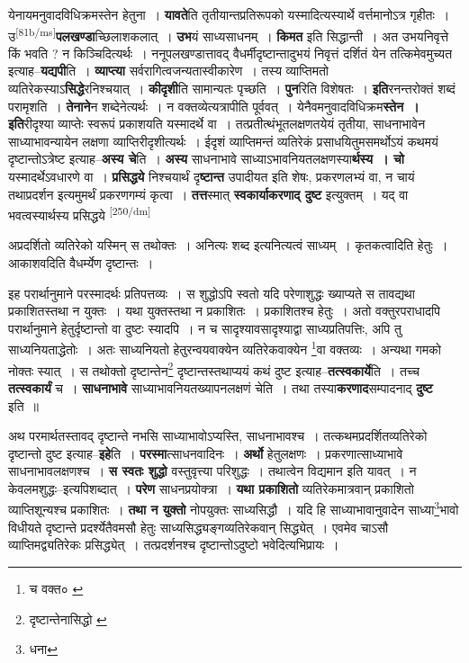 \documentclass[article,12pt,a4paper]{memoir}
\begin{document}
	  \pstart येनायमनुवादविधिक्रमस्तेन हेतुना । \textbf{यावते}ति तृतीयान्तप्रतिरूपको यस्मादित्यस्यार्थे वर्त्तमानोऽत्र गृहीतः । उ\leavevmode\textsuperscript{\rmlatinfont\tiny [81b/ms]}\textbf{पलखण्डा}च्छिलाशकलात् । \textbf{उभ}यं साध्यसाधनम् । \textbf{किमत} इति सिद्धान्ती । अत उभयनिवृत्ते किं भवति ? न किञ्चिदित्यर्थः । ननूपलखण्डात्तावद् वैधर्मीदृष्टान्तादुभयं निवृत्तं दर्शितं येन तत्किमेवमुच्यत इत्याह--\textbf{यद्यपी}ति । \textbf{व्याप्त्या} सर्वरागित्वजन्यतास्वीकारेण । तस्य व्याप्तिमतो व्यतिरेकस्याऽ\textbf{सिद्धे}रनिश्चयात् । \textbf{कीदृशी}ति सामान्यतः पृच्छति । \textbf{पुन}रिति विशेषतः । \textbf{इति}रनन्तरोक्तं शब्दं परामृशति । \textbf{तेनाने}न शब्देनेत्यर्थः । न वक्तव्येत्यत्रापीति पूर्ववत् । येनैवमनुवादविधिक्रम\textbf{स्तेन । इति}रीदृश्या व्याप्तेः स्वरूपं प्रकाशयति यस्मादर्थे वा । तत्प्रतीत्थंभूतलक्षणतयेयं तृतीया, साधनाभावेन साध्याभावन्यायेन लक्षणा व्याप्तिरीदृशीत्यर्थः । ईदृशं व्याप्तिमन्तं व्यतिरेकं प्रसाधयितुमसमर्थोऽयं कथमयं दृष्टान्तोऽत्रेष्ट इत्याह--\textbf{अस्य चे}ति । \textbf{अस्य} साधनाभावे साध्याऽभावनियतलक्षणस्या\textbf{र्थस्य । चो} यस्मादर्थेऽवधारणे वा । \textbf{प्रसिद्धये} निश्चयार्थं दृ\textbf{ष्टान्त} उपादीयत इति शेषः, प्रकरणलभ्यं वा, न चायं तथाप्रदर्शन इत्यमुमर्थं प्रकरणगम्यं कृत्वा । \textbf{तत्त}स्मात् \textbf{स्वकार्याकरणाद् दुष्ट} इत्युक्तम् । यद् वा भवत्वस्यार्थस्य प्रसिद्धये          \leavevmode\textsuperscript{\rmlatinfont\tiny [250/dm]} 
	  
	अप्रदर्शितो व्यतिरेको यस्मिन् स तथोक्तः । अनित्यः शब्द इत्यनित्यत्वं साध्यम् । कृतकत्वादिति हेतुः । आकाशवदिति वैधर्म्येण दृष्टान्तः । 
	  
	इह परार्थानुमाने परस्मादर्थः प्रतिपत्तव्यः । स शुद्धोऽपि स्वतो यदि परेणाशुद्धः ख्याप्यते स तावद्यथा प्रकाशितस्तथा न युक्तः । यथा युक्तस्तथा न प्रकाशितः । प्रकाशितश्च हेतुः । अतो वक्तुरपराधादपि परार्थानुमाने हेतुर्दृष्टान्तो वा दुष्टः स्यादपि । न च सादृश्यावसादृश्याद्वा साध्यप्रतिपत्तिः, अपि तु साध्यनियताद्धेतोः । अतः साध्यनियतो हेतुरन्वयवाक्येन व्यतिरेकवाक्येन \footnote{च वक्त० \cite{dp-msA} \cite{dp-msB} \cite{dp-edP} \cite{dp-edH} \cite{dp-edE} \cite{dp-edN}}वा वक्तव्यः । अन्यथा गमको नोक्तः स्यात् । स तथोक्तो दृष्टान्तेन\footnote{दृष्टान्तेनासिद्धो \cite{dp-msB}} दृष्टान्तस्तथाप्ययं कथं दुष्ट इत्याह--\textbf{तत्स्वकार्ये}ति । तच्च \textbf{तत्स्वकार्यं} च । \textbf{साधनाभावे} साध्याभावनियतख्यापनलक्षणं चेति । तथा तस्या\textbf{करणाद}सम्पादनाद् \textbf{दुष्ट} इति ॥
	\pend
      

	  \pstart अथ परमार्थतस्तावद् दृष्टान्ते नभसि साध्याभावोऽप्यस्ति, साधनाभावश्च । तत्कथमप्रदर्शितव्यतिरेको दृष्टान्तो दुष्ट इत्याह--\textbf{इहे}ति । \textbf{परस्मा}त्साधनवादिनः । \textbf{अर्थो} हेतुलक्षणः । प्रकरणात्साध्याभावे साधनाभावलक्षणश्च । \textbf{स स्वतः शुद्धो} वस्तुवृत्त्या परिशुद्धः । तथात्वेन विद्यमान इति यावत् । न केवलमशुद्धः--इत्यपिशब्दात् । \textbf{परेण} साधनप्रयोक्त्रा । \textbf{यथा प्रकाशितो} व्यतिरेकमात्रवान् प्रकाशितो व्याप्तिशून्यश्च प्रकाशितः । \textbf{तथा न युक्तो} नोपयुक्तः साध्यसिद्धौ । यदि हि साध्याभावानुवादेन साध्या\footnote{धना}भावो विधीयते दृष्टान्ते प्रदर्श्येतैवमसौ हेतुः साध्यसिद्ध्यङ्गव्यतिरेकवान् सिद्ध्येत् । एवमेव चाऽसौ व्याप्तिमद्व्यतिरेकः प्रसिद्ध्येत् । तत्प्रदर्शनश्च दृष्टान्तोऽदुष्टो भवेदित्यभिप्रायः ।
	\pend
      
\end{document}
